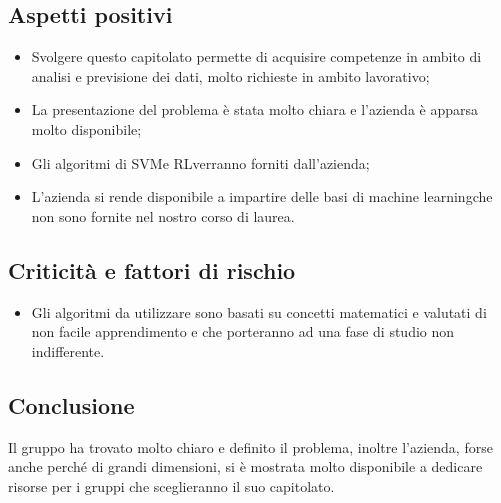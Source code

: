 \subsection{Aspetti positivi}
\begin{itemize} 
	\item Svolgere questo capitolato permette di acquisire competenze in ambito di analisi e previsione dei dati, molto richieste in ambito lavorativo;
	\item La presentazione del problema è stata molto chiara e l'azienda è apparsa molto disponibile;
	\item Gli algoritmi di SVM\glosp e RL\glosp verranno forniti dall'azienda;
  \item L'azienda si rende disponibile a impartire delle basi di machine learning\glosp che non sono fornite nel nostro corso di laurea.
\end{itemize}
\subsection{Criticità e fattori di rischio}
\begin{itemize}
	\item Gli algoritmi da utilizzare sono basati su concetti matematici e valutati di non facile apprendimento e che porteranno ad una fase di studio non indifferente. 
\end{itemize}
\subsection{Conclusione}
Il gruppo ha trovato molto chiaro e definito il problema, inoltre l'azienda, forse anche perché di grandi dimensioni, si è mostrata molto disponibile a dedicare risorse per i gruppi che sceglieranno il suo capitolato.
